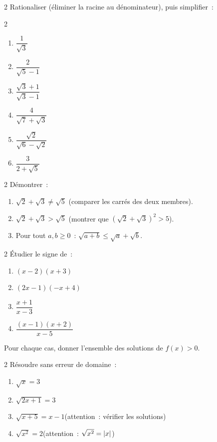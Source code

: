 \begin{exo}{2}
Rationaliser (\'eliminer la racine au d\'enominateur), puis simplifier~:
\begin{multicols}{2}
\begin{enumerate}
  \item $\dfrac{1}{\sqrt{3}}$
  \item $\dfrac{2}{\sqrt{5}-1}$
  \item $\dfrac{\sqrt{3}+1}{\sqrt{3}-1}$
  \item $\dfrac{4}{\sqrt{7}+\sqrt{3}}$
  \item $\dfrac{\sqrt{2}}{\sqrt{6}-\sqrt{2}}$
  \item $\dfrac{3}{2+\sqrt{5}}$
\end{enumerate}
\end{multicols}
\end{exo}

\begin{exo}{2}
D\'emontrer~:
\begin{enumerate}
  \item $\sqrt{2}+\sqrt{3} \ne \sqrt{5}$
        (comparer les carr\'es des deux membres).
  \item $\sqrt{2}+\sqrt{3} > \sqrt{5}$
        (montrer que $(\sqrt{2}+\sqrt{3})^2 > 5$).
  \item Pour tout $a, b \geq 0$~:
        $\sqrt{a+b} \leq \sqrt{a} + \sqrt{b}$.
\end{enumerate}
\end{exo}

\begin{exo}{2}
\'Etudier le signe de~:
\begin{enumerate}
  \item $(x-2)(x+3)$
  \item $(2x-1)(-x+4)$
  \item $\dfrac{x+1}{x-3}$
  \item $\dfrac{(x-1)(x+2)}{x-5}$
\end{enumerate}
Pour chaque cas, donner l'ensemble des solutions de $f(x) > 0$.
\end{exo}

\begin{exo}{2}
R\'esoudre sans erreur de domaine~:
\begin{enumerate}
  \item $\sqrt{x} = 3$
  \item $\sqrt{2x+1} = 3$
  \item $\sqrt{x+5} = x-1$\quad (attention~: v\'erifier les solutions)
  \item $\sqrt{x^2} = 2$\quad (attention~: $\sqrt{x^2} = \left|x\right|$)
\end{enumerate}
\end{exo}

